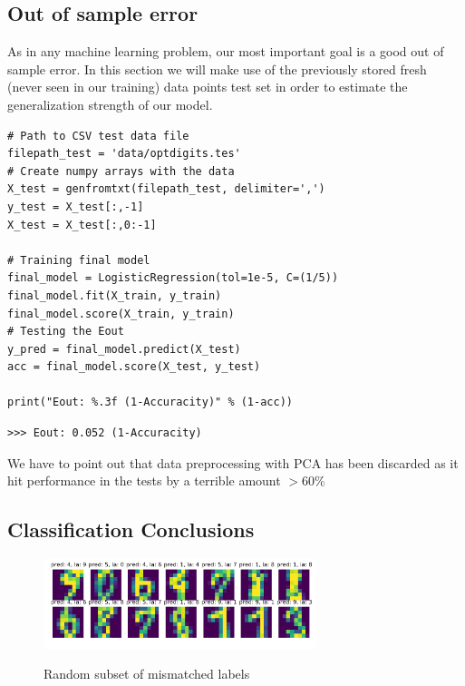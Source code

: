\documentclass{article}
\begin{document}
\subsection{Out of sample error}
As in any machine learning problem, our most important goal is a good out of sample error. In this section we will make use of the previously stored fresh (never seen in our training) data points test set in order to estimate the generalization strength of our model.

\begin{verbatim}
# Path to CSV test data file
filepath_test = 'data/optdigits.tes'
# Create numpy arrays with the data
X_test = genfromtxt(filepath_test, delimiter=',')
y_test = X_test[:,-1]
X_test = X_test[:,0:-1]

# Training final model
final_model = LogisticRegression(tol=1e-5, C=(1/5))
final_model.fit(X_train, y_train)
final_model.score(X_train, y_train)
# Testing the Eout
y_pred = final_model.predict(X_test)
acc = final_model.score(X_test, y_test)

print("Eout: %.3f (1-Accuracity)" % (1-acc))
\end{verbatim}

\begin{verbatim}
>>> Eout: 0.052 (1-Accuracity)
\end{verbatim}

We have to point out that data preprocessing with PCA has been discarded as it hit performance in the tests by a terrible amount $>60 \%$

\subsection{Classification Conclusions}

\begin{figure}[H]
    \centering
    \includegraphics[width=300px]{figures/fig04}
    \label{fig:Dataset visualization}
    \caption{Random subset of mismatched labels}
\end{figure}
\end{document}
